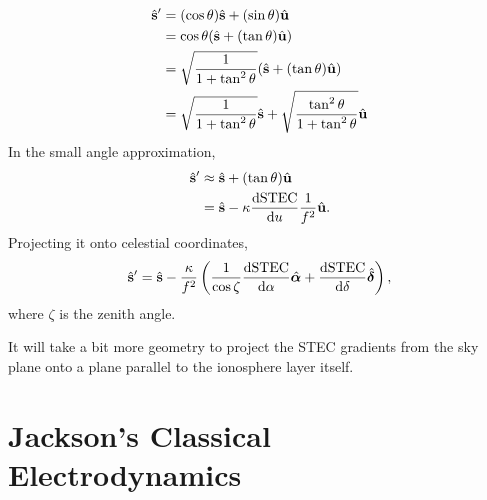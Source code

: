 \documentclass{book}
\newcommand{\deriv}[2]{\frac{\text{d}{#1}}{\text{d}{#2}}}
\newcommand{\shat}{\hat{\bf s}}
\begin{document}
\begin{equation}
    \begin{aligned}
        \shat^\prime
            &= (\cos\theta) \shat + (\sin\theta) \hat{\bf u} \\
            &= \cos\theta(\shat + (\tan\theta) \hat{\bf u}) \\
            &= \sqrt{\frac{1}{1 + \tan^2\theta}} (\shat + (\tan\theta) \hat{\bf u}) \\
            &= \sqrt{\frac{1}{1 + \tan^2\theta}} \shat + \sqrt{\frac{\tan^2\theta}{1 + \tan^2\theta}} \hat{\bf u}
    \end{aligned}
\end{equation}
In the small angle approximation,
\begin{equation}
    \begin{aligned}
        \shat^\prime
            &\approx \shat + (\tan\theta) \hat{\bf u} \\
            &= \shat - \kappa\deriv{\text{STEC}}{u} \frac{1}{f^2} \hat{\bf u}.
    \end{aligned}
\end{equation}
Projecting it onto celestial coordinates,
\begin{equation}
    \shat^\prime = \shat - \frac{\kappa}{f^2} \left( \frac{1}{\cos\zeta} \deriv{\text{STEC}}{\alpha}\hat{\bm{\alpha}} + \deriv{\text{STEC}}{\delta}\hat{\bm{\delta}} \right),
\end{equation}
where $\zeta$ is the zenith angle.

It will take a bit more geometry to project the STEC gradients from the sky plane onto a plane parallel to the ionosphere layer itself.

\chapter{Jackson's Classical Electrodynamics}
\end{document}
